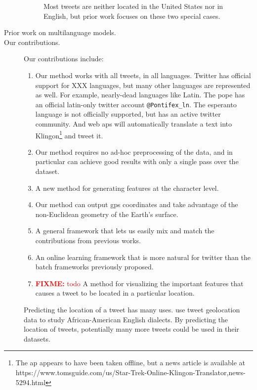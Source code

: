 \documentclass[sigconf,10pt]{acmart}
\newcommand{\str}[1]{\texttt{#1}}
\newcommand{\fixme}[1]{\textcolor{red}{\textbf{FIXME:} {#1}}}
\begin{document}
\begin{description}
\begin{figure}
    \resizebox{0.225\textwidth}{!}{}
    \resizebox{0.225\textwidth}{!}{}
    \caption{Most tweets are neither located in the United States nor in English,
    but prior work focuses on these two special cases.}
    \label{fig:country/lang}
\end{figure}

\item[Prior work on multilanguage models.]

\item[Our contributions.]
Our contributions include:
\begin{enumerate}
    \item
        Our method works with all tweets, in all languages.
        Twitter has official support for XXX languages,
        but many other languages are represented as well.
        For example, nearly-dead languages like Latin.
        The pope has an official latin-only twitter account \str{@Pontifex\_ln}.
        The esperanto language is not officially supported, but has an active twitter community.
        And web aps will automatically translate a text into Klingon\footnote{The ap appears to have been taken offline, but a news article is available at https://www.tomsguide.com/us/Star-Trek-Online-Klingon-Translator,news-5294.html} and tweet it.
    \item
        Our method requires no ad-hoc preprocessing of the data,
        and in particular can achieve good results with only a single pass over the dataset.
    \item
        A new method for generating features at the character level.
    \item
        Our method can output gps coordinates and take advantage of the non-Euclidean geometry of the Earth's surface.
    \item
        A general framework that lets us easily mix and match the contributions from previous works.
    \item
        An online learning framework that is more natural for twitter than the batch frameworks previously proposed.
    \item
        \fixme{todo}
        A method for visualizing the important features that causes a tweet to be located in a particular location.
\end{enumerate}

Predicting the location of a tweet has many uses.
\citet{blodgett2016demographic} use tweet geolocation data to study African-American English dialects.
By predicting the location of tweets, potentially many more tweets could be used in their datasets.


\end{description}
\end{document}
